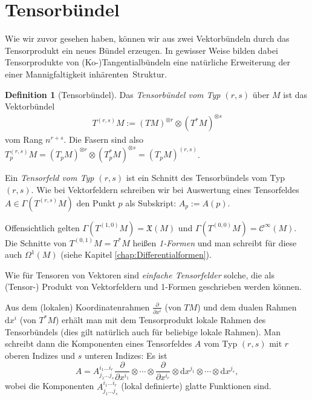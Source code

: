 \documentclass[a4paper]{scrreprt}
\numberwithin{equation}{chapter}
\newcommand{\D}{\mathrm{d}}
\newcommand{\sC}{\mathcal{C}^{\infty}}
\newcommand{\vf}{\mathfrak{X}}
\theoremstyle{definition}
\newtheorem{defn}{Definition}[section]
\begin{document}
	\section{Tensorbündel}
		Wie wir zuvor gesehen haben, können wir aus zwei Vektorbündeln durch das Tensorprodukt ein neues Bündel erzeugen. In gewisser Weise bilden dabei Tensorprodukte von (Ko-)Tangentialbündeln eine natürliche Erweiterung der einer Mannigfaltigkeit \glqq inhärenten\grqq\ Struktur.
	\begin{defn}[Tensorbündel]
	Das \emph{Tensorbündel vom Typ $(r,s)$} über $M$ ist das Vektorbündel
	\begin{align*}
		T^{(r,s)}M := (TM)^{\otimes r} \otimes (T^*M)^{\otimes s}
	\end{align*}
	vom Rang $n^{r+s}$. Die Fasern sind also $T^{(r,s)}_pM = (T_pM)^{\otimes r} \otimes (T_p^*M)^{\otimes s} = (T_pM)^{(r,s)}$.

	Ein \emph{Tensorfeld vom Typ $(r,s)$} ist ein Schnitt des Tensorbündels vom Typ $(r,s)$. Wie bei Vektorfeldern schreiben wir bei Auswertung eines Tensorfeldes $A \in \Gamma(T^{(r,s)}M)$ den Punkt $p$ als Subskript: $A_p := A(p)$.

Offensichtlich gelten $\Gamma(T^{(1,0)}M)=\vf(M)$ und $\Gamma(T^{(0,0)}M)=\sC(M)$. Die Schnitte von $T^{(0,1)}M=T^*M$ heißen \emph{1-Formen} und man schreibt für diese auch $\Omega^1(M)$ (siehe Kapitel \ref{chap:Differentialformen}).
			
			Wie für Tensoren von Vektoren sind \emph{einfache Tensorfelder} solche, die als (Tensor-) Produkt von Vektorfeldern und 1-Formen geschrieben werden können.
			
			Aus dem (lokalen) Koordinatenrahmen $\frac{\partial}{\partial x^i}$ (von $TM$) und dem dualen Rahmen $\D x^i$ (von $T^*M$) erhält man mit dem Tensorprodukt lokale Rahmen des Tensorbündels (dies gilt natürlich auch für beliebige lokale Rahmen). Man schreibt dann die Komponenten eines Tensorfeldes $A$ vom Typ $(r,s)$ mit $r$ oberen Indizes und $s$ unteren Indizes: Es ist
			\[A = A^{i_1\ldots i_r}_{j_1\ldots j_s} \frac{\partial}{\partial x^{i_1}} \otimes \cdots \otimes \frac{\partial}{\partial x^{i_r}} \otimes \D x^{j_1} \otimes \cdots \otimes \D x^{j_s},\]
			wobei die Komponenten $A^{i_1\ldots i_r}_{j_1\ldots j_s}$ (lokal definierte) glatte Funktionen sind.
		\end{defn}
		
\end{document}

